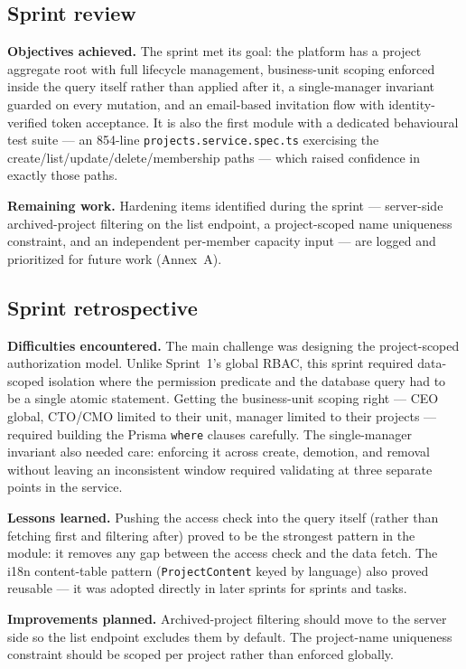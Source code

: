 \subsection{Sprint review}

\textbf{Objectives achieved.} The sprint met its goal: the platform has a project aggregate root
with full lifecycle management, business-unit scoping enforced inside the query itself rather
than applied after it, a single-manager invariant guarded on every mutation, and an email-based
invitation flow with identity-verified token acceptance. It is also the first module with a dedicated
behavioural test suite --- an 854-line \texttt{projects.service.spec.ts} exercising the
create/list/update/delete/membership paths --- which raised confidence in exactly those paths.

\textbf{Remaining work.} Hardening items identified during the sprint --- server-side
archived-project filtering on the list endpoint, a project-scoped name uniqueness constraint, and
an independent per-member capacity input --- are logged and prioritized for future work (Annex~A).

\subsection{Sprint retrospective}

\textbf{Difficulties encountered.} The main challenge was designing the project-scoped
authorization model. Unlike Sprint~1's global RBAC, this sprint required data-scoped isolation
where the permission predicate and the database query had to be a single atomic statement.
Getting the business-unit scoping right --- CEO global, CTO/CMO limited to their unit, manager
limited to their projects --- required building the Prisma \texttt{where} clauses carefully. The
single-manager invariant also needed care: enforcing it across create, demotion, and removal
without leaving an inconsistent window required validating at three separate points in the
service.

\textbf{Lessons learned.} Pushing the access check into the query itself (rather than fetching
first and filtering after) proved to be the strongest pattern in the module: it removes any gap
between the access check and the data fetch. The i18n content-table pattern
(\texttt{ProjectContent} keyed by language) also proved reusable --- it was adopted directly in
later sprints for sprints and tasks.

\textbf{Improvements planned.} Archived-project filtering should move to the server side so the
list endpoint excludes them by default. The project-name uniqueness constraint should be scoped
per project rather than enforced globally.

